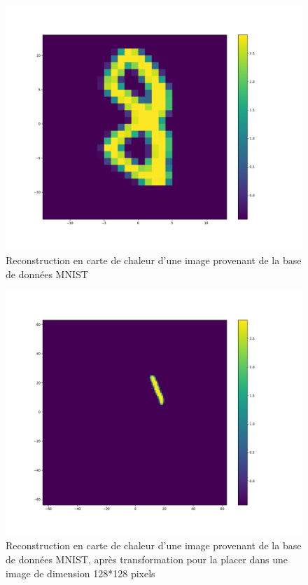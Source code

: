 \begin{figure}[th]
\centering
\includegraphics[scale=0.3]{Figures/MNIST_28}
\decoRule %
\caption[Figure]{Reconstruction en carte de chaleur d'une image provenant de la base de données MNIST}
\label{fig:MNIST_28}
\end{figure}

\begin{figure}[th]
\centering
\includegraphics[scale=0.3]{Figures/MNIST_128}
\decoRule
\caption[Figure]{Reconstruction en carte de chaleur d'une image provenant de la base de données MNIST, après transformation pour la placer dans une image de dimension 128*128 pixels}
\label{fig:MNIST_128}
\end{figure}


